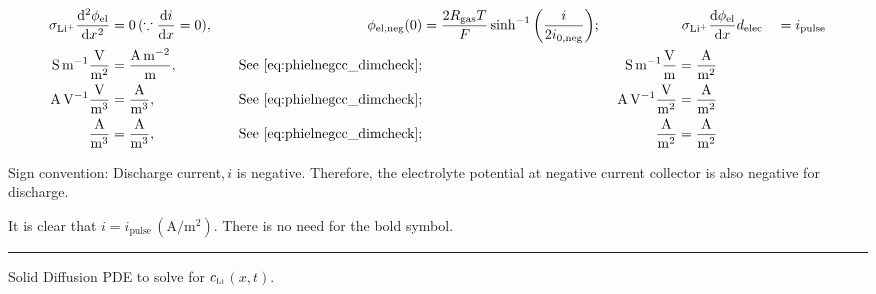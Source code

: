\documentclass{article}
\newcommand{\cLi}{\ensuremath{c_{\mathchoice{}{}{\scriptscriptstyle}{} \mathrm{L}\mathrm{i}}}}
\begin{document}
\begin{alignat}{4}
    \sigma_\mathrm{Li^+}\diff[2]{\phi_\text{el}}{x} &= 0\, (\because \diff{i}{x}=0),  &\qquad \phi_\text{el,neg}(0) &= \frac{2 R_\text{gas} T}{F} \sinh^{-1}\bigg(\frac{i}{2 i_\text{0,neg}}\bigg); &&\  \sigma_\mathrm{Li^+}\diff{\phi_\text{el}}{x}{d_\text{elec}} &&= i_\text{pulse} \\
    \si{\siemens\per\metre}\frac{\si{\volt}}{\si{\meter\squared}} &= \frac{\si{\ampere\per\meter\squared}}{\si{\meter}}, &\quad \text{See}~\eqref{eq:phielnegcc_dimcheck}; &&\ \si{\siemens\per\meter}\frac{\si{\volt}}{\si{\meter}} &= \frac{\si{\ampere}}{\si{\meter\squared}} \\
    \si{\ampere\per\volt}\frac{\si{\volt}}{\si{\meter\cubed}} &= \frac{\si{\ampere}}{\si{\meter\cubed}}, &\quad \text{See}~\eqref{eq:phielnegcc_dimcheck}; &&\ \si{\ampere\per\volt}\frac{\si{\volt}}{\si{\meter\squared}} &= \frac{\si{\ampere}}{\si{\meter\squared}} \\
    \frac{\si{\ampere}}{\si{\meter\cubed}} &= \frac{\si{\ampere}}{\si{\meter\cubed}}, &\quad \text{See}~\eqref{eq:phielnegcc_dimcheck}; &&\ \frac{\si{\ampere}}{\si{\meter\squared}} &= \frac{\si{\ampere}}{\si{\meter\squared}} \\
\end{alignat}

Sign convention: Discharge current,\,\(i\) is negative.  Therefore, the electrolyte potential at negative current collector is also negative for discharge.


It is clear that \(i = i_\text{pulse}\, (\si{\ampere\per\meter\squared})\). There is no need for the bold symbol.

\medskip
\hrule

\bigskip

Solid Diffusion PDE to solve for \cLi$(x,t)$.
\end{document}
